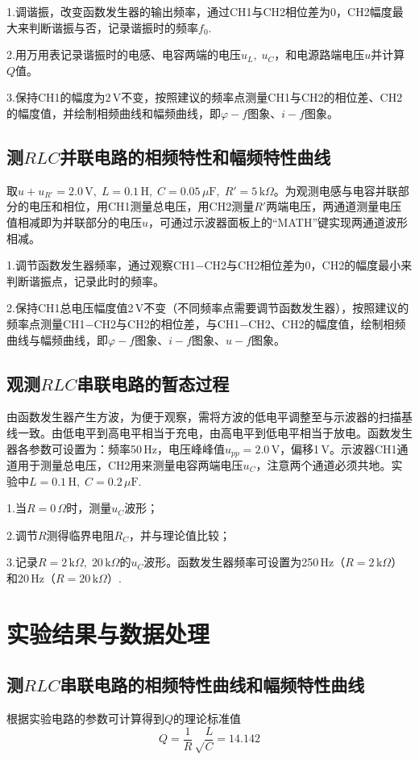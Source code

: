 \documentclass[UTF-8,twoside,cs4size]{ctexart}
\begin{document}
	1.调谐振，改变函数发生器的输出频率，通过CH1与CH2相位差为0，CH2幅度最大来判断谐振与否，记录谐振时的频率$ f_0 $.
	
	2.用万用表记录谐振时的电感、电容两端的电压$ u_L,\;u_C $，和电源路端电压$ u $并计算$ Q $值。
	
	3.保持CH1的幅度为$ 2\,\mathrm V $不变，按照建议的频率点测量CH1与CH2的相位差、CH2的幅度值，并绘制相频曲线和幅频曲线，即$ \varphi-f $图象、$ i-f $图象。
	
	\subsection{测$ RLC $并联电路的相频特性和幅频特性曲线}
	取$ u+u_{R'}=2.0\,\mathrm V,\;L=0.1\,\mathrm H,\;C=0.05\,\mu\mathrm F,\;R'=5\,\mathrm k\Omega $。为观测电感与电容并联部分的电压和相位，用CH1测量总电压，用CH2测量$ R' $两端电压，两通道测量电压值相减即为并联部分的电压$ u $，可通过示波器面板上的“MATH”键实现两通道波形相减。
	
	1.调节函数发生器频率，通过观察CH1$ - $CH2与CH2相位差为0，CH2的幅度最小来判断谐振点，记录此时的频率。
	
	2.保持CH1总电压幅度值2\,V不变（不同频率点需要调节函数发生器），按照建议的频率点测量CH1$ - $CH2与CH2的相位差，与CH1$ - $CH2、CH2的幅度值，绘制相频曲线与幅频曲线，即$ \varphi-f $图象、$ i-f $图象、$ u-f $图象。
	
	\subsection{观测$ RLC $串联电路的暂态过程}
	由函数发生器产生方波，为便于观察，需将方波的低电平调整至与示波器的扫描基线一致。由低电平到高电平相当于充电，由高电平到低电平相当于放电。函数发生器各参数可设置为：频率50\,Hz，电压峰峰值$ u_{pp}=2.0\,\mathrm V $，偏移1\,V。示波器CH1通道用于测量总电压，CH2用来测量电容两端电压$ u_C $，注意两个通道必须共地。实验中$ L=0.1\,\mathrm H,\;C=0.2\,\mu\mathrm F $.
	
	1.当$ R=0\,\Omega $时，测量$ u_C $波形；
	
	2.调节$ R $测得临界电阻$ R_C $，并与理论值比较；
	
	3.记录$ R=2\,\mathrm{k}\Omega,\;20\,\mathrm k\Omega $的$ u_C $波形。函数发生器频率可设置为250\,Hz（$ R=2\,\mathrm k\Omega $）和20\,Hz（$ R=20\,\mathrm k\Omega $）.
	
	\section{实验结果与数据处理}
	\subsection{测$ RLC $串联电路的相频特性曲线和幅频特性曲线}
	根据实验电路的参数可计算得到$ Q $的理论标准值
	\[Q=\frac1R\sqrt\frac LC=14.142\]
	
\end{document}
